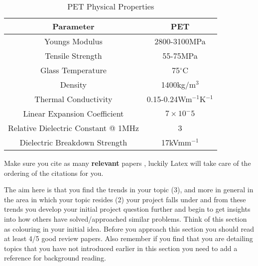 \begin{table}[ht]
	\centering
		\begin{tabular}{ c  c  }
		\hline
		\hline
		Parameter & PET \\
		\hline
		Youngs Modulus & 2800-3100MPa \\
		Tensile Strength & 55-75MPa \\
		Glass Temperature & 75$^\circ$C \\
		Density & 1400kg/m$^3$ \\
		Thermal Conductivity & 0.15-0.24Wm$^{-1}$K$^{-1}$ \\
		Linear Expansion Coefficient & $7\times10^-5$ \\
		Relative Dielectric Constant @ 1MHz & 3\\
		Dielectric Breakdown Strength & 17kVmm$^{-1}$\\
		\end{tabular}
	\caption{PET Physical Properties}
	\label{tab:Mylar}
\end{table}

Make sure you cite\cite{Reference1} as many \textbf{relevant} papers \cite{Reference3}, luckily Latex will take care of the ordering of the citations \cite{Reference2} for you.

The aim here is that you find the trends in your topic (3), and more in general in the area in which your topic resides (2) your project falls under and from these trends you develop your initial project question further and begin to get insights into how others have solved/approached similar problems. Think of this section as colouring in your initial idea. Before you approach this section you should read at least 4/5 good review papers. Also remember if you find that you are detailing topics that you have not introduced earlier in this section you need to add a reference for background reading.
